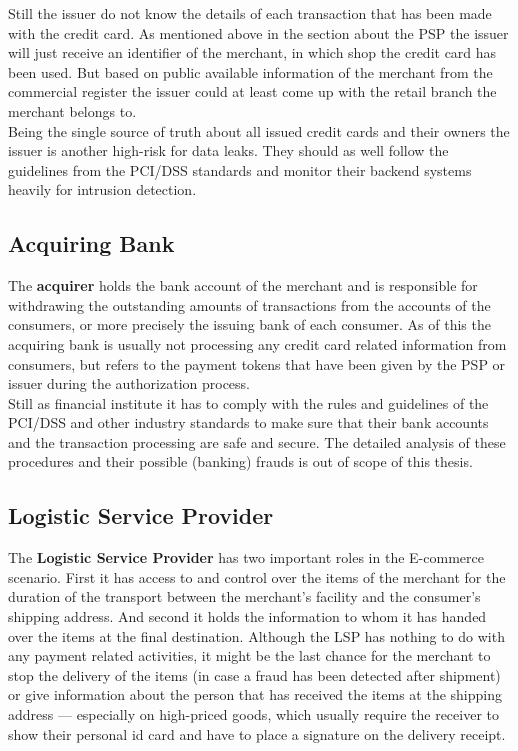 Still the issuer do not know the details of each transaction that has been made with the credit card. As mentioned above in the section about the \gls{PSP} the issuer will just receive an identifier of the merchant, in which shop the credit card has been used. But based on public available information of the merchant from the commercial register the issuer could at least come up with the retail branch the merchant belongs to. \\

Being the single source of truth about all issued credit cards and their owners the issuer is another high-risk for data leaks. They should as well follow the guidelines from the PCI/DSS standards and monitor their backend systems heavily for intrusion detection.


\subsection{Acquiring Bank}
\label{subsec:stakeholder_acquirer}

The \textbf{acquirer} holds the bank account of the merchant and is responsible for withdrawing the outstanding amounts of transactions from the accounts of the consumers, or more precisely the issuing bank of each consumer. As of this the acquiring bank is usually not processing any credit card related information from consumers, but refers to the payment tokens that have been given by the \gls{PSP} or \gls{issuer} during the authorization process. \\

Still as financial institute it has to comply with the rules and guidelines of the PCI/DSS and other industry standards to make sure that their bank accounts and the transaction processing are safe and secure. The detailed analysis of these procedures and their possible (banking) frauds is out of scope of this thesis.


\subsection{Logistic Service Provider}
\label{subsec:stakeholder_lsp}

The \textbf{Logistic Service Provider} has two important roles in the E-commerce scenario. First it has access to and control over the items of the merchant for the duration of the transport between the merchant's facility and the consumer's shipping address. And second it holds the information to whom it has handed over the items at the final destination. Although the \gls{LSP} has nothing to do with any payment related activities, it might be the last chance for the merchant to stop the delivery of the items (in case a fraud has been detected after shipment) or give information about the person that has received the items at the shipping address --- especially on high-priced goods, which usually require the receiver to show their personal id card and have to place a signature on the delivery receipt. \\

